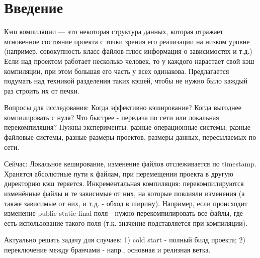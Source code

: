 \chapter{Введение}
Кэш компиляции --- это некоторая структура данных, которая отражает мгновенное состояние проекта с точки зрения его реализации на низком уровне (например, совокупность класс-файлов плюс информация о зависимостях и т.д.) Если над проектом работает несколько человек, то у каждого нарастает свой кэш компиляции, при этом большая его часть у всех одинакова. Предлагается подумать над техникой разделения таких кэшей, чтобы не нужно было каждый раз строить их от печки.

Вопросы для исследования: Когда эффективно кэширование? Когда выгоднее компилировать с нуля? Что быстрее - передача по сети или локальная перекомпиляция? Нужны эксперименты: разные операционные системы, разные файловые системы, разные размеры проектов, размеры данных, пересылаемых по сети.

Сейчас: Локальное кеширование, изменение файлов отслеживается по timestamp. Хранятся абсолютные пути к файлам, при перемещении проекта в другую директорию кэш теряется. Инкрементальная компиляция: перекомпилируются изменённые файлы и те зависимые от них, на которые повлияли изменения (а также зависимые от них, и т.д. - обход в ширину). Например, если происходит изменение public static final поля - нужно перекомпилировать все файлы, где есть использование такого поля (т.к. значение подставляется при компиляции).

Актуально решать задачу для случаев: 1) cold start - полный билд проекта; 2) переключение между бранчами - напр., основная и релизная ветка.